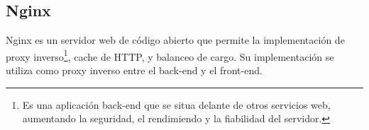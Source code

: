 \subsection{Nginx}

Nginx es un servidor web de código abierto que permite la implementación de
proxy inverso\footnote{Es una aplicación back-end que se situa delante de otros servicios web, aumentando la seguridad, el rendimiendo y la fiabilidad del servidor.}, cache de HTTP, y balanceo de cargo.
Su implementación se utiliza como proxy inverso entre el back-end y el front-end.



